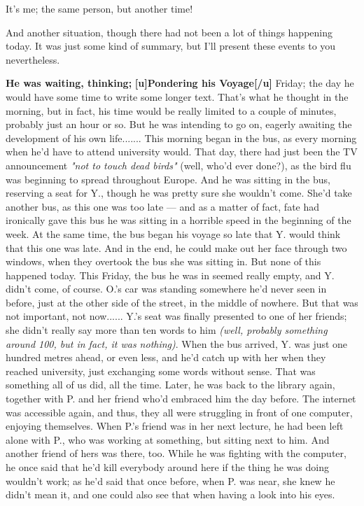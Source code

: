 It's me; the same person, but another time!

And another situation, though there had not been a lot of things happening today. It was just some kind of summary, but I'll present these events to you nevertheless. 

\textbf{He was waiting, thinking;}
\textbf{[u]Pondering his Voyage[/u]}
Friday; the day he would have some time to write some longer text. 
That's what he thought in the morning, but in fact, his time would be really limited to a couple of minutes, probably just an hour or so. But he was intending to go on, eagerly awaiting the development of his own life.......
This morning began in the bus, as every morning when he'd have to attend university would. That day, there had just been the TV announcement \emph{"not to touch dead birds"} (well, who'd ever done?), as the bird flu was beginning to spread throughout Europe. 
And he was sitting in the bus, reserving a seat for Y., though he was pretty sure she wouldn't come. She'd take another bus, as this one was too late --- and as a matter of fact, fate had ironically gave this bus he was sitting in a horrible speed in the beginning of the week. At the same time, the bus began his voyage so late that Y. would think that this one was late. And in the end, he could make out her face through two windows, when they overtook the bus she was sitting in. 
But none of this happened today. 
This Friday, the bus he was in seemed really empty, and Y. didn't come, of course. O.'s car was standing somewhere he'd never seen in before, just at the other side of the street, in the middle of nowhere. But that was not important, not now......
Y.'s seat was finally presented to one of her friends; she didn't really say more than ten words to him \emph{(well, probably something around 100, but in fact, it was nothing)}. When the bus arrived, Y. was just one hundred metres ahead, or even less, and he'd catch up with her when they reached university, just exchanging some words without sense. That was something all of us did, all the time. 
Later, he was back to the library again, together with P. and her friend who'd embraced him the day before. The internet was accessible again, and thus, they all were struggling in front of one computer, enjoying themselves. When P.'s friend was in her next lecture, he had been left alone with P., who was working at something, but sitting next to him. And another friend of hers was there, too. While he was fighting with the computer, he once said that he'd kill everybody around here if the thing he was doing wouldn't work; as he'd said that once before, when P. was near, she knew he didn't mean it, and one could also see that when having a look into his eyes. 
